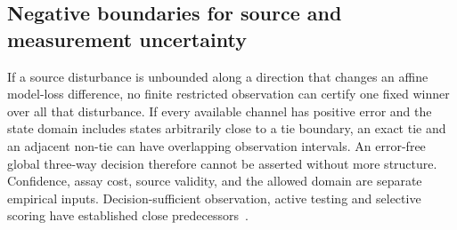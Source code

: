 \subsection{Negative boundaries for source and measurement uncertainty}
If a source disturbance is unbounded along a direction that changes an affine model-loss difference, no finite restricted observation can certify one fixed winner over all that disturbance. If every available channel has positive error and the state domain includes states arbitrarily close to a tie boundary, an exact tie and an adjacent non-tie can have overlapping observation intervals. An error-free global three-way decision therefore cannot be asserted without more structure. Confidence, assay cost, source validity, and the allowed domain are separate empirical inputs. Decision-sufficient observation, active testing and selective scoring have established close predecessors~\cite{bennouna2025decision,ye2026decisionsufficient,kossen2021activetesting}.

